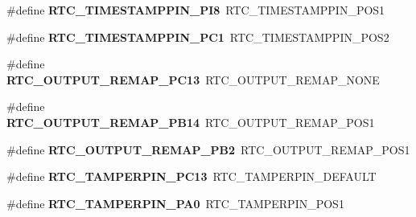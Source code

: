\begin{DoxyCompactItemize}
\item 
\#define {\bfseries R\+T\+C\+\_\+\+T\+I\+M\+E\+S\+T\+A\+M\+P\+P\+I\+N\+\_\+\+P\+I8}~R\+T\+C\+\_\+\+T\+I\+M\+E\+S\+T\+A\+M\+P\+P\+I\+N\+\_\+\+P\+O\+S1\hypertarget{group___h_a_l___r_t_c___aliased___defines_ga06c626929730d0b055830978be00b438}{}\label{group___h_a_l___r_t_c___aliased___defines_ga06c626929730d0b055830978be00b438}

\item 
\#define {\bfseries R\+T\+C\+\_\+\+T\+I\+M\+E\+S\+T\+A\+M\+P\+P\+I\+N\+\_\+\+P\+C1}~R\+T\+C\+\_\+\+T\+I\+M\+E\+S\+T\+A\+M\+P\+P\+I\+N\+\_\+\+P\+O\+S2\hypertarget{group___h_a_l___r_t_c___aliased___defines_ga8bed03c3348ec3005e7b80e73fd13cc0}{}\label{group___h_a_l___r_t_c___aliased___defines_ga8bed03c3348ec3005e7b80e73fd13cc0}

\item 
\#define {\bfseries R\+T\+C\+\_\+\+O\+U\+T\+P\+U\+T\+\_\+\+R\+E\+M\+A\+P\+\_\+\+P\+C13}~R\+T\+C\+\_\+\+O\+U\+T\+P\+U\+T\+\_\+\+R\+E\+M\+A\+P\+\_\+\+N\+O\+NE\hypertarget{group___h_a_l___r_t_c___aliased___defines_ga677d55aef2a7915a4a75befab8a5abaf}{}\label{group___h_a_l___r_t_c___aliased___defines_ga677d55aef2a7915a4a75befab8a5abaf}

\item 
\#define {\bfseries R\+T\+C\+\_\+\+O\+U\+T\+P\+U\+T\+\_\+\+R\+E\+M\+A\+P\+\_\+\+P\+B14}~R\+T\+C\+\_\+\+O\+U\+T\+P\+U\+T\+\_\+\+R\+E\+M\+A\+P\+\_\+\+P\+O\+S1\hypertarget{group___h_a_l___r_t_c___aliased___defines_gac67309963a2eaf95230e716c8e3f0377}{}\label{group___h_a_l___r_t_c___aliased___defines_gac67309963a2eaf95230e716c8e3f0377}

\item 
\#define {\bfseries R\+T\+C\+\_\+\+O\+U\+T\+P\+U\+T\+\_\+\+R\+E\+M\+A\+P\+\_\+\+P\+B2}~R\+T\+C\+\_\+\+O\+U\+T\+P\+U\+T\+\_\+\+R\+E\+M\+A\+P\+\_\+\+P\+O\+S1\hypertarget{group___h_a_l___r_t_c___aliased___defines_gae3219018581da1cc5687fe218d3f2a2d}{}\label{group___h_a_l___r_t_c___aliased___defines_gae3219018581da1cc5687fe218d3f2a2d}

\item 
\#define {\bfseries R\+T\+C\+\_\+\+T\+A\+M\+P\+E\+R\+P\+I\+N\+\_\+\+P\+C13}~R\+T\+C\+\_\+\+T\+A\+M\+P\+E\+R\+P\+I\+N\+\_\+\+D\+E\+F\+A\+U\+LT\hypertarget{group___h_a_l___r_t_c___aliased___defines_ga203603ca0741ea3f23beca505a121351}{}\label{group___h_a_l___r_t_c___aliased___defines_ga203603ca0741ea3f23beca505a121351}

\item 
\#define {\bfseries R\+T\+C\+\_\+\+T\+A\+M\+P\+E\+R\+P\+I\+N\+\_\+\+P\+A0}~R\+T\+C\+\_\+\+T\+A\+M\+P\+E\+R\+P\+I\+N\+\_\+\+P\+O\+S1\hypertarget{group___h_a_l___r_t_c___aliased___defines_ga0eddec9c4aeae415fe983c2940a45a9d}{}\label{group___h_a_l___r_t_c___aliased___defines_ga0eddec9c4aeae415fe983c2940a45a9d}


\end{DoxyCompactItemize}
